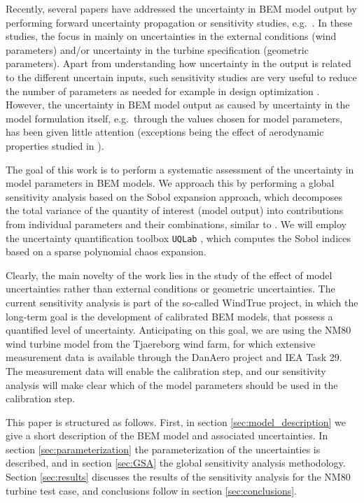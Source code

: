 \documentclass[review]{elsarticle}
\numberwithin{equation}{section}
\numberwithin{equation}{section}
\begin{document}
Recently, several papers have addressed the uncertainty in BEM model output by performing forward uncertainty propagation or sensitivity studies, e.g.\ \cite{Echeverria2017,Matthaus2017,Murcia2018,Robertson2018,Bos2019a}. In these studies, the focus in mainly on uncertainties in the external conditions (wind parameters) and/or uncertainty in the turbine specification (geometric parameters). Apart from understanding how uncertainty in the output is related to the different uncertain inputs, such sensitivity studies are very useful to reduce the number of parameters as needed for example in design optimization \cite{Echeverria2017}. However, the uncertainty in BEM model output as caused by uncertainty in the model formulation itself, e.g.\ through the values chosen for model parameters, has been given little attention (exceptions being the effect of aerodynamic properties studied in \cite{Matthaus2017,Bortolotti2019}).

The goal of this work is to perform a systematic assessment of the uncertainty in model parameters in BEM models. We approach this by performing a global sensitivity analysis based on the Sobol expansion approach, which decomposes the total variance of the quantity of interest (model output) into contributions from individual parameters and their combinations, similar to \cite{Echeverria2017,Murcia2018,Rinker2016}. We will employ the uncertainty quantification toolbox \texttt{UQLab} \cite{uqlab}, which computes the Sobol indices based on a sparse polynomial chaos expansion. 

Clearly, the main novelty of the work lies in the study of the effect of model uncertainties rather than external conditions or geometric uncertainties. The current sensitivity analysis is part of the so-called WindTrue project, in which the long-term goal is the development of calibrated BEM models, that possess a quantified level of uncertainty. Anticipating on this goal, we are using the NM80 wind turbine model from the Tjaereborg wind farm, for which extensive measurement data is available through the DanAero project \cite{Troldborg2013} and IEA Task 29. The measurement data will enable the calibration step, and our sensitivity analysis will make clear which of the model parameters should be used in the calibration step.

This paper is structured as follows. First, in section \ref{sec:model_description} we give a short description of the BEM model and associated uncertainties. In section \ref{sec:parameterization} the parameterization of the uncertainties is described, and in section \ref{sec:GSA} the global sensitivity analysis methodology. Section \ref{sec:results} discusses the results of the sensitivity analysis for the NM80 turbine test case, and conclusions follow in section \ref{sec:conclusions}.
\end{document}
